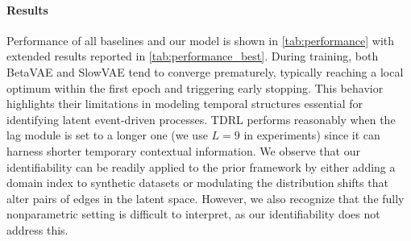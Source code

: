 \documentclass[10pt]{article}
\numberwithin{figure}{section}
\begin{document}
\paragraph{Results} Performance of all baselines and our model is shown in \autoref{tab:performance} with extended results reported in \autoref{tab:performance_best}. During training, both BetaVAE and SlowVAE tend to converge prematurely, typically reaching a local optimum within the first epoch and triggering early stopping. This behavior highlights their limitations in modeling temporal structures essential for identifying latent event-driven processes. TDRL performs reasonably when the lag module is set to a longer one (we use $L=9$ in experiments) since it can harness shorter temporary contextual information. We observe that our identifiability can be readily applied to the prior framework by either adding a domain index to synthetic datasets or modulating the distribution shifts that alter pairs of edges in the latent space. However, we also recognize that the fully nonparametric setting is difficult to interpret, as our identifiability does not address this.








\end{document}
